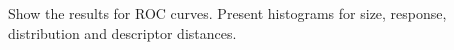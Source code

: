 Show the results for ROC curves.
Present histograms for size, response, distribution and descriptor distances.
